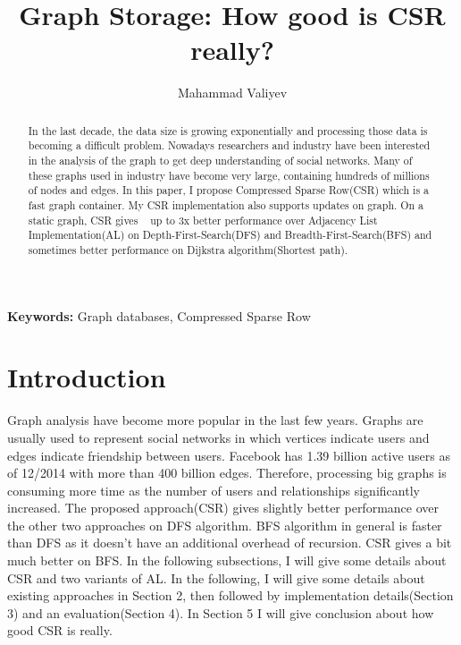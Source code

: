 \documentclass{article}
\title{Graph Storage: How good is CSR really?}
\author{Mahammad Valiyev}
\begin{document}
\maketitle

\begin{abstract}
  In the last decade, the data size is growing exponentially and processing those data is becoming a difficult problem. Nowadays researchers and industry have been interested in the analysis of the graph to get deep understanding of social networks. Many of these graphs used in industry have become very large, containing hundreds of millions of nodes and edges. In this paper, I propose Compressed Sparse Row(CSR) which is a fast graph container. My CSR implementation also supports updates on graph. On a static graph, CSR gives ~ up to 3x better performance over Adjacency List Implementation(AL) on Depth-First-Search(DFS) and Breadth-First-Search(BFS) and sometimes better performance on Dijkstra algorithm(Shortest path).
\end{abstract}
\textbf{Keywords:} Graph databases, Compressed Sparse Row

\section{Introduction}
Graph analysis have become more popular in the last few years. Graphs are usually used to represent social networks in which vertices indicate users and edges indicate friendship between users. Facebook has 1.39 billion  active users as of 12/2014 with more than 400 billion edges\cite{fb}. Therefore, processing big graphs is consuming more time as the number of users and relationships significantly increased. The proposed approach(CSR) gives slightly better performance over the other two approaches on DFS algorithm. BFS algorithm in general is faster than DFS as it doesn't have an additional overhead of recursion. CSR gives a bit much better on BFS. In the following subsections, I will give some details about CSR and two variants of AL. In the following, I will give some details about existing approaches in Section 2, then followed by implementation details(Section 3) and an evaluation(Section 4). In Section 5 I will give conclusion about how good CSR is really.
\end{document}
